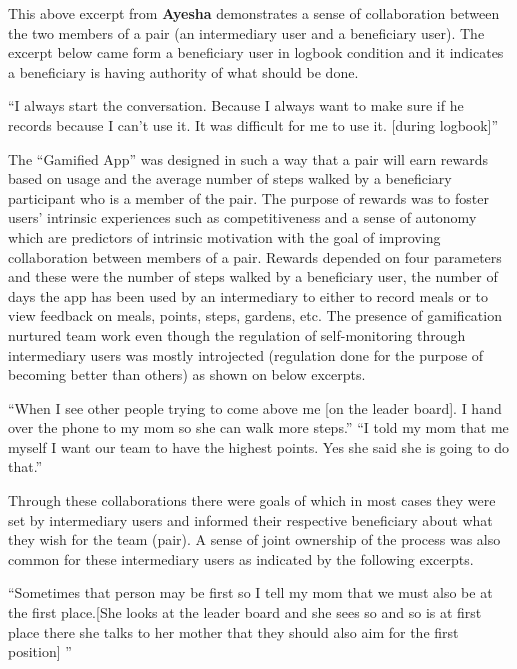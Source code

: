 This above excerpt from \textbf{Ayesha} demonstrates a sense of collaboration between the two members of a pair (an intermediary user and a beneficiary user). The excerpt below came form a beneficiary user in logbook condition and it indicates a beneficiary is having authority of what should be done. 

 {``I always start the conversation. Because I always want to make sure if he records because I can't use it. It was difficult for me to use it. [during logbook]''}

The ``Gamified App'' was designed in such a way that a pair will earn rewards based on usage and the average number of steps walked by a beneficiary participant who is a member of the pair. The purpose of rewards was to foster users' intrinsic experiences such as competitiveness and a sense of autonomy which are predictors of intrinsic motivation with the goal of improving collaboration between members of a pair. Rewards depended on four parameters and these were the number of steps walked by a beneficiary user, the number of days the app has been used by an intermediary to either to record meals or to view feedback on meals, points, steps, gardens, etc. The presence of gamification nurtured  team work  even though the regulation of self-monitoring through intermediary users was mostly introjected (regulation done for the purpose of becoming better than others) as shown on below excerpts.

 {``When I see other people trying to come above me [on the leader board]. I hand over the phone to my mom so she can walk more steps.''}
 {``I told my mom that me myself I want our team to have the highest points. Yes she said she is going to do that.''}

Through these collaborations there were goals of which in most cases they were set by intermediary users and informed their respective beneficiary about what they wish for the team (pair). A sense of joint ownership of the process was also common for these intermediary users as indicated by the following excerpts. 

 {``Sometimes that person may be first so I tell my mom that we must also be at the first place.[She looks at the  leader board and she sees so and so is at first place there she talks to her mother that they should also aim for the first position] ''} 

